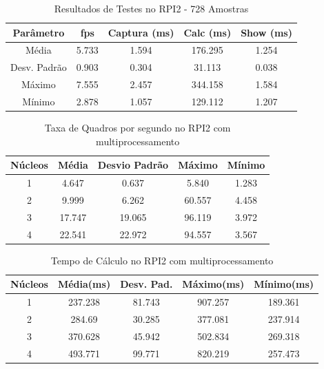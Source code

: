 \documentclass[conference]{IEEEtran}
\begin{document}
\begin{table}[h]\centering
\renewcommand{\arraystretch}{1.3}
\caption{Resultados de Testes no RPI2 - 728 Amostras}
\label{tab:table_rpi}
\begin{tabular}{|c|c|c|c|c|}

\hline
\textbf{Parâmetro} & \textbf{fps} & \textbf{Captura (ms)} & \textbf{Calc (ms)} & \textbf{Show (ms)} \\\hline \hline
Média			& 5.733 & 1.594	&	176.295	&	1.254	\\ \hline
Desv. Padrão	& 0.903 & 0.304	&	31.113	&	0.038	\\ \hline
Máximo			& 7.555 & 2.457 &	344.158	&	1.584	\\ \hline
Mínimo			& 2.878 & 1.057 &	129.112	&	1.207	\\ \hline

\end{tabular}
\end{table}


\begin{table}[h]\centering
\renewcommand{\arraystretch}{1.3}
\caption{Taxa de Quadros por segundo no RPI2 com multiprocessamento}
\label{tab:table_rpi_cores_fps}
\begin{tabular}{|c|c|c|c|c|}

\hline
\textbf{Núcleos} & \textbf{Média} & \textbf{Desvio Padrão} & \textbf{Máximo} & \textbf{Mínimo} \\\hline \hline
1		& 4.647		& 0.637		&	5.840	&	1.283	\\ \hline
2		& 9.999		& 6.262		&	60.557	&	4.458	\\ \hline
3		& 17.747	& 19.065 	&	96.119	&	3.972	\\ \hline
4		& 22.541	& 22.972	&	94.557	&	3.567	\\ \hline

\end{tabular}
\end{table}

\begin{table}[h]\centering
\renewcommand{\arraystretch}{1.3}
\caption{Tempo de Cálculo no RPI2 com multiprocessamento}
\label{tab:table_rpi_cores_calc}
\begin{tabular}{|c|c|c|c|c|}

\hline
\textbf{Núcleos} & \textbf{Média(ms)} & \textbf{Desv. Pad.} & \textbf{Máximo(ms)} & \textbf{Mínimo(ms)} \\\hline \hline
1		&	237.238	&	81.743	&	907.257	&	189.361	\\ \hline
2		&	284.69	&	30.285	&	377.081	&	237.914	\\ \hline
3		&	370.628	&	45.942	&	502.834	&	269.318	\\ \hline
4		&	493.771	&	99.771	&	820.219	&	257.473	\\ \hline


\end{tabular}
\end{table}
\end{document}
